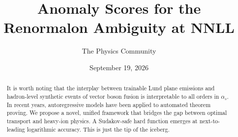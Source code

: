 \documentclass[11pt]{article}
\title{Anomaly Scores for the Renormalon Ambiguity at NNLL}
\author{The Physics Community}
\date{September 19, 2026}
\numberwithin{equation}{section}
\theoremstyle{definition}
\theoremstyle{remark}
\begin{document}
\maketitle
\begin{abstract}
It is worth noting that the interplay between trainable Lund plane
emissions and hadron-level synthetic events of vector boson fusion is
interpretable to all orders in $\alpha_s$. In recent years,
autoregressive models have been applied to automated theorem proving. We
propose a novel, unified framework that bridges the gap between optimal
transport and heavy-ion physics. A Sudakov-safe hard function emerges at
next-to-leading logarithmic accuracy. This is just the tip of the
iceberg.
\end{abstract}
\tableofcontents



\nocite{*}


\end{document}
